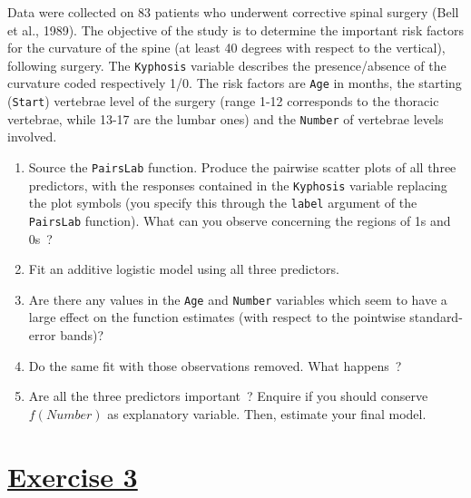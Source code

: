 \documentclass[a4paper,12pt]{article}\usepackage[]{graphicx}\usepackage[]{color}
\begin{document}
Data were collected on 83 patients who underwent corrective spinal surgery (Bell et al., 1989). The objective of the study is to determine the important risk factors for the curvature of the spine (at least 40 degrees with respect to the vertical), following surgery. The \verb"Kyphosis" variable describes the presence/absence of the curvature coded respectively 1/0. The risk factors are \verb"Age" in months, the starting (\verb"Start") vertebrae level of the surgery (range 1-12 corresponds to the thoracic vertebrae, while 13-17 are the lumbar ones) and the \verb"Number" of vertebrae levels involved.
\begin{enumerate}
\item{Source the \verb"PairsLab" function. Produce the pairwise scatter plots of all three predictors, with the responses contained in the \verb"Kyphosis" variable replacing the plot symbols (you specify this through the \texttt{label} argument of the \texttt{PairsLab} function). What can you observe concerning the regions of 1s and 0s~?}
\item{Fit an additive logistic model using all three predictors.}
\item{%
   Are there any values in the \verb"Age" and \verb"Number" variables which seem to have a large effect on the function estimates (with respect to the pointwise standard-error bands)?}
\item{Do the same fit with those observations removed. What happens~?}
\item{Are all the three predictors important~? Enquire if you should conserve $f(Number)$ as explanatory variable. Then, estimate your final model.}
\end{enumerate}


\section{\underline{Exercise 3}}
\end{document}
